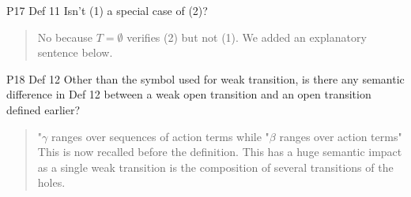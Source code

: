 \documentclass{article}
\begin{document}
P17 Def 11 Isn’t (1) a special case of (2)?
\begin{quote}
No because $T=\emptyset$ verifies (2) but not (1).
We added an explanatory sentence below.
\end{quote}

P18 Def 12 Other than the symbol used for weak transition, is there any semantic difference in Def 12 between a weak open transition and an open transition defined earlier?
\begin{quote}
"$\gamma$ ranges over sequences of action terms while "$\beta$ ranges over action terms"
This is now recalled before the definition.
This has a huge semantic impact as a single weak transition is the composition of several transitions of the holes.
\end{quote}
\end{document}
